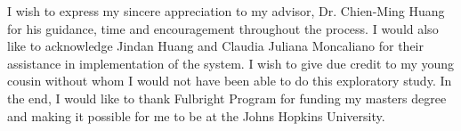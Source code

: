 
I wish to express my sincere appreciation to my advisor, Dr. Chien-Ming Huang for his guidance, time and encouragement throughout the process. I would also like to acknowledge Jindan Huang and Claudia Juliana Moncaliano for their assistance in implementation of the system. I wish to give due credit to my young cousin without whom I would not have been able to do this exploratory study. In the end, I would like to thank Fulbright Program for funding my masters degree and making it possible for me to be at the Johns Hopkins University.